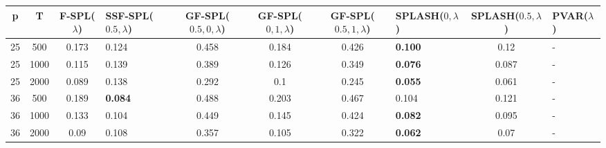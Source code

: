 \begin{tabular}{ccclccclcl}
\hline
  p  &  T   &  F-SPL($\lambda$)  & SSF-SPL($0.5, \lambda$)   &  GF-SPL($0.5, 0, \lambda$)  &  GF-SPL($0, 1, \lambda$)  &  GF-SPL($0.5, 1, \lambda$)  & SPLASH($0, \lambda$)   &  SPLASH($0.5, \lambda$)  & PVAR($\lambda$)   \\
\hline
 25  & 500  &       0.173        & 0.124                     &            0.458            &           0.184           &            0.426            & \textbf{0.100}         &           0.12           & -                 \\
 25  & 1000 &       0.115        & 0.139                     &            0.389            &           0.126           &            0.349            & \textbf{0.076}         &          0.087           & -                 \\
 25  & 2000 &       0.089        & 0.138                     &            0.292            &            0.1            &            0.245            & \textbf{0.055}         &          0.061           & -                 \\
 36  & 500  &       0.189        & \textbf{0.084}            &            0.488            &           0.203           &            0.467            & 0.104                  &          0.121           & -                 \\
 36  & 1000 &       0.133        & 0.104                     &            0.449            &           0.145           &            0.424            & \textbf{0.082}         &          0.095           & -                 \\
 36  & 2000 &        0.09        & 0.108                     &            0.357            &           0.105           &            0.322            & \textbf{0.062}         &           0.07           & -                 \\
\hline
\end{tabular}
